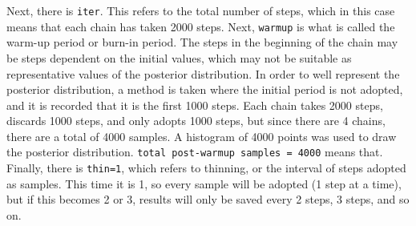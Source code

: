 \documentclass{ltjbook}
\begin{document}
Next, there is \texttt{iter}. This refers to the total number of steps, which in this case means that each chain has taken 2000 steps. Next, \texttt{warmup} is what is called the warm-up period or burn-in period. The steps in the beginning of the chain may be steps dependent on the initial values, which may not be suitable as representative values of the posterior distribution. In order to well represent the posterior distribution, a method is taken where the initial period is not adopted, and it is recorded that it is the first 1000 steps. Each chain takes 2000 steps, discards 1000 steps, and only adopts 1000 steps, but since there are 4 chains, there are a total of 4000 samples. A histogram of 4000 points was used to draw the posterior distribution. \texttt{total post-warmup samples = 4000} means that. Finally, there is \texttt{thin=1}, which refers to thinning, or the interval of steps adopted as samples. This time it is 1, so every sample will be adopted (1 step at a time), but if this becomes 2 or 3, results will only be saved every 2 steps, 3 steps, and so on.
\end{document}
